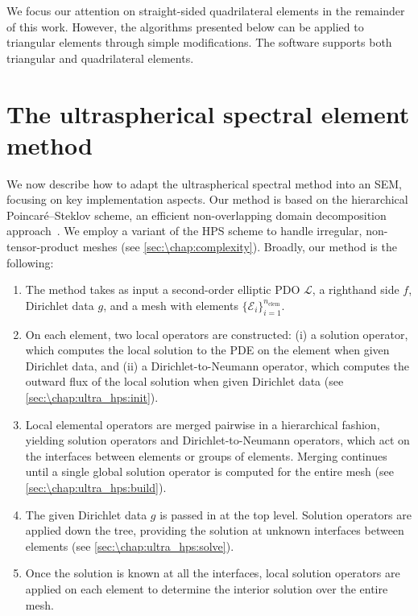 We focus our attention on straight-sided quadrilateral elements in the remainder of this work. However, the algorithms presented below can be applied to triangular elements through simple modifications. The \ultraSEM software supports both triangular and quadrilateral elements.

\section{The ultraspherical spectral element method}\label{sec:\chap:ultraSEM}
We now describe how to adapt the ultraspherical spectral method into an SEM, focusing on key implementation aspects. Our method is based on the hierarchical Poincar\'{e}--Steklov scheme, an efficient non-overlapping domain decomposition approach~\cite{Martinsson_09_01, Martinsson_13_01, Gillman_14_01, Gillman_14_02, Babb_18_01, Martinsson_19_01}. We employ a variant of the HPS scheme to handle irregular, non-tensor-product meshes (see \cref{sec:\chap:complexity}). Broadly, our method is the following:

\vspace{1em}
\begin{enumerate}[itemsep=0.5em]

\item The method takes as input a second-order elliptic PDO $\mathcal{L}$, a righthand side $f$, Dirichlet data $g$, and a mesh with elements $\{\mathcal{E}_i\}_{i=1}^{n_\text{elem}}$.

\item On each element, two local operators are constructed: (i) a solution operator, which computes the local solution to the PDE on the element when given Dirichlet data, and (ii) a Dirichlet-to-Neumann operator, which computes the outward flux of the local solution when given Dirichlet data (see \cref{sec:\chap:ultra_hps:init}).

\item Local elemental operators are merged pairwise in a hierarchical fashion, yielding solution operators and Dirichlet-to-Neumann operators, which act on the interfaces between elements or groups of elements. Merging continues until a single global solution operator is computed for the entire mesh (see \cref{sec:\chap:ultra_hps:build}).

\item The given Dirichlet data $g$ is passed in at the top level. Solution operators are applied down the tree, providing the solution at unknown interfaces between elements (see \cref{sec:\chap:ultra_hps:solve}).

\item Once the solution is known at all the interfaces, local solution operators are applied on each element to determine the interior solution over the entire mesh.

\end{enumerate}
\vspace{1em}

